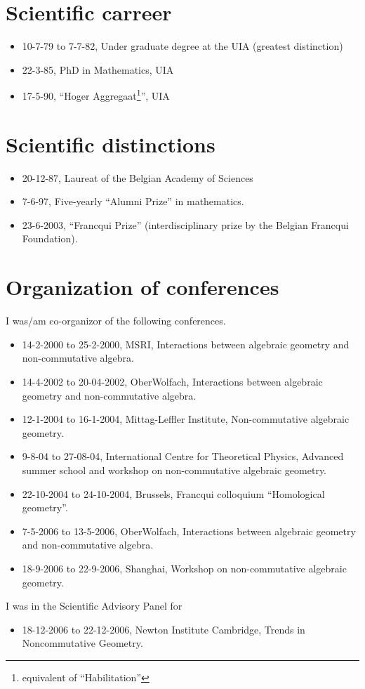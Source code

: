 \documentclass{amsart}
\begin{document}
\section*{Scientific carreer}
\begin{itemize}
\item
10-7-79 to 7-7-82, Under graduate degree at the UIA (greatest distinction)
\item
22-3-85, PhD in Mathematics, UIA
\item
17-5-90, ``Hoger Aggregaat\footnote{equivalent of ``Habilitation''}'', UIA
\end{itemize}
\section*{Scientific distinctions}
\begin{itemize}
\item
20-12-87, Laureat of the Belgian Academy of Sciences
\item 
7-6-97, Five-yearly ``Alumni Prize'' in mathematics.
\item
23-6-2003, ``Francqui Prize'' (interdisciplinary prize by the Belgian
Francqui Foundation).
\end{itemize}
\section*{Organization of conferences}
I was/am co-organizor of the following conferences.
\begin{itemize}
\item 14-2-2000 to 25-2-2000, MSRI, Interactions between algebraic geometry
  and non-commutative algebra.
\item 14-4-2002 to 20-04-2002, OberWolfach, Interactions between
  algebraic geometry and non-commutative algebra. 
\item 12-1-2004 to 16-1-2004, Mittag-Leffler Institute, Non-commutative
algebraic geometry.
\item 9-8-04 to 27-08-04, International Centre for Theoretical
  Physics, Advanced summer school and workshop on non-commutative
  algebraic geometry.
\item 22-10-2004 to 24-10-2004, Brussels, Francqui colloquium 
``Homological geometry''.
\item 7-5-2006 to 13-5-2006, OberWolfach, Interactions between
  algebraic geometry and non-commutative algebra.
\item 18-9-2006 to 22-9-2006, Shanghai, Workshop on non-commutative algebraic
geometry.
\end{itemize}
I was in the Scientific Advisory Panel for
\begin{itemize}
\item 18-12-2006 to 22-12-2006, Newton Institute Cambridge, Trends in Noncommutative Geometry.
\end{itemize}
\end{document}
